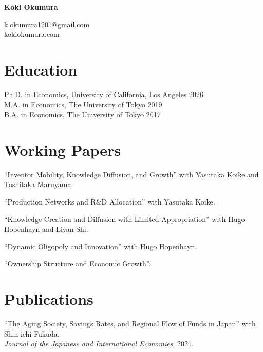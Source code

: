 \documentclass[11pt]{article}
\begin{document}
\pagestyle{empty}
\begin{minipage}[c]{0.50\textwidth}
	\bfseries\huge Koki Okumura
\end{minipage}%
\hfill%
\begin{minipage}[c]{0.33\textwidth}
	\href{mailto:k.okumura1201@gmail.com}{\faEnvelope\hspace{.3em} k.okumura1201@gmail.com}\\
	\href{https://www.kokiokumura.com/}{\faGlobe\hspace{.3em} kokiokumura.com}
\end{minipage}

\section{Education}
Ph.D. in Economics, University of California, Los Angeles \hfill 2026\\
M.A. in Economics, The University of Tokyo \hfill 2019\\
B.A. in Economics, The University of Tokyo \hfill 2017

\section{Working Papers}

``Inventor Mobility, Knowledge Diffusion, and Growth'' with Yasutaka Koike and
Toshitaka Maruyama.

``Production Networks and R\&D Allocation'' with Yasutaka Koike.

``Knowledge Creation and Diffusion with Limited Appropriation'' with Hugo Hopenhayn and Liyan Shi.

``Dynamic Oligopoly and Innovation'' with Hugo Hopenhayn.

``Ownership Structure and Economic Growth''.

\section{Publications}
``The Aging Society, Savings Rates, and Regional Flow of Funds in Japan'' with Shin-ichi Fukuda.\\
{\it Journal of the Japanese and International Economies}, 2021.
\end{document}
